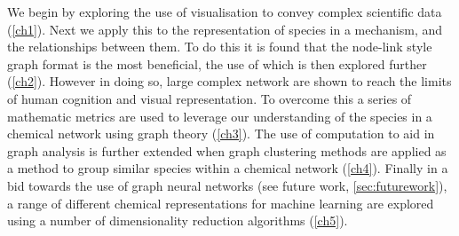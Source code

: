 We begin by exploring the use of visualisation to convey complex scientific data (\autoref{ch1}). Next we apply this to the representation of species in a mechanism, and the relationships between them. To do this it is found that the node-link style graph format is the most beneficial, the use of which is then explored further (\autoref{ch2}).
However in doing so, large complex network are shown to reach the limits of human cognition and visual representation. To overcome this a series of mathematic metrics are used to leverage our understanding of the species in a chemical network using graph theory (\autoref{ch3}). The use of computation to aid in graph analysis is further extended when graph clustering methods are applied as a method to group similar species within a chemical network (\autoref{ch4}). Finally in a bid towards the use of graph neural networks (see future work, \autoref{sec:futurework}), a range of different chemical representations for machine learning are explored using a number of dimensionality reduction algorithms (\autoref{ch5}).
